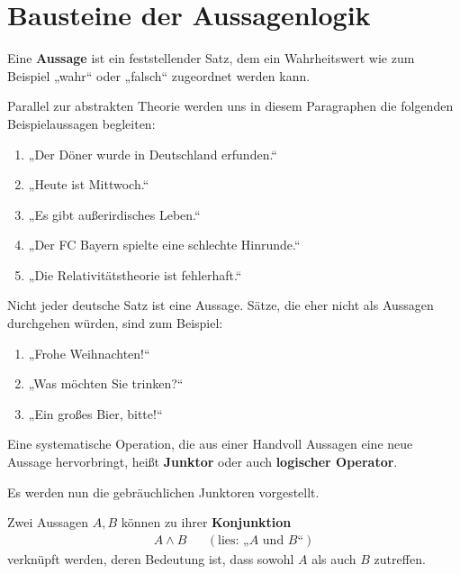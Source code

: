 \section{Bausteine der Aussagenlogik}


\begin{de}[Aussage] \label{def:aussage}
    Eine \textbf{Aussage} ist ein feststellender Satz, dem ein Wahrheitswert wie zum Beispiel „wahr“ oder „falsch“ zugeordnet werden kann.
\end{de}
	

\begin{bsp}
    Parallel zur abstrakten Theorie werden uns in diesem Paragraphen die folgenden Beispielaussagen begleiten:
    \begin{enumerate}[label={$B_{\arabic*}:=$}, labelindent=1.5em, leftmargin=*, series=propbsp]
        \item „Der Döner wurde in Deutschland erfunden.“
        \item „Heute ist Mittwoch.“
        \item „Es gibt außerirdisches Leben.“
        \item „Der FC Bayern spielte eine schlechte Hinrunde.“
        \item „Die Relativitätstheorie ist fehlerhaft.“
    \end{enumerate}
    Nicht jeder deutsche Satz ist eine Aussage. Sätze, die eher nicht als Aussagen durchgehen würden, sind zum Beispiel: \quad
    \begin{enumerate}[resume*]
        \item[] „Frohe Weihnachten!“
        \item[] „Was möchten Sie trinken?“
        \item[] „Ein großes Bier, bitte!“
    \end{enumerate}
\end{bsp}


\begin{de}[Junktor] 
    Eine systematische Operation, die aus einer Handvoll Aussagen eine neue Aussage hervorbringt, heißt \textbf{Junktor} oder auch \textbf{logischer Operator}.
\end{de}


Es werden nun die gebräuchlichen Junktoren vorgestellt.


\begin{de} 
    Zwei Aussagen $A,B$ können zu ihrer \textbf{Konjunktion}
    \begin{align*}
        A\land B && (\text{lies: „$A$ und $B$“})
    \end{align*}
    verknüpft werden, deren Bedeutung ist, dass sowohl $A$ als auch $B$ zutreffen.
\end{de}


